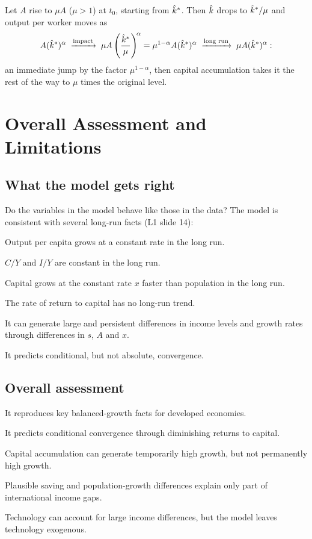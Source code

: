 \documentclass[11pt]{article}
\begin{document}
\begin{extra}
Let $A$ rise to $\mu A$ ($\mu > 1$) at $t_0$, starting from $\hat{k}^*$. Then $\hat{k}$ drops to $\hat{k}^*/\mu$ and output per worker moves as
\[
A(\hat{k}^*)^{\alpha} \;\xrightarrow{\text{impact}}\; \mu A\left(\frac{\hat{k}^*}{\mu}\right)^{\!\alpha} = \mu^{1-\alpha}A(\hat{k}^*)^{\alpha} \;\xrightarrow{\text{long run}}\; \mu A(\hat{k}^*)^{\alpha}:
\]
an immediate jump by the factor $\mu^{1-\alpha}$, then capital accumulation takes it the rest of the way to $\mu$ times the original level.
\end{extra}

\section{Overall Assessment and Limitations}

\subsection{What the model gets right}
Do the variables in the model behave like those in the data? The model is consistent with several long-run facts (L1 slide 14):
\begin{flatnum}
  \item Output per capita grows at a constant rate in the long run.
  \item $C/Y$ and $I/Y$ are constant in the long run.
  \item Capital grows at the constant rate $x$ faster than population in the long run.
  \item The rate of return to capital has no long-run trend.
  \item It can generate large and persistent differences in income levels and growth rates through differences in $s$, $A$ and $x$.
  \item[6--7.] It predicts conditional, but not absolute, convergence.
\end{flatnum}

\subsection{Overall assessment}
\begin{flatlist}
  \item It reproduces key balanced-growth facts for developed economies.
  \item It predicts conditional convergence through diminishing returns to capital.
  \item Capital accumulation can generate temporarily high growth, but not permanently high growth.
  \item Plausible saving and population-growth differences explain only part of international income gaps.
  \item Technology can account for large income differences, but the model leaves technology exogenous.
\end{flatlist}
\end{document}
